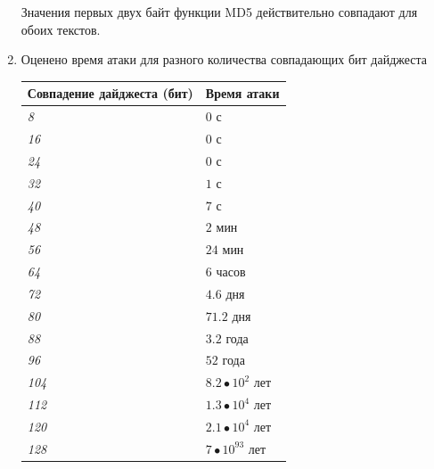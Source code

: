 \documentclass[a4paper, 14pt]{extarticle}
\begin{document}
\begin{enumerate}
        Значения первых двух байт функции MD5 действительно совпадают для обоих текстов.
    \item Оценено время атаки для разного количества совпадающих бит дайджеста

        \begin{table}[h]
            \centering
            \begin{tabular}{@{}ll@{}}
                \toprule
                \textbf{Совпадение дайджеста (бит)} & \textbf{Время атаки}   \\ \midrule
                \textit{8}                          & $0$ с                  \\
                \textit{16}                         & $0$ с                  \\
                \textit{24}                         & $0$ с                  \\
                \textit{32}                         & $1$ с                  \\
                \textit{40}                         & $7$ с                  \\
                \textit{48}                         & $2$ мин                \\
                \textit{56}                         & $24$ мин               \\
                \textit{64}                         & $6$ часов              \\
                \textit{72}                         & $4.6$ дня              \\
                \textit{80}                         & $71.2$ дня             \\
                \textit{88}                         & $3.2$ года             \\
                \textit{96}                         & $52$ года              \\
                \textit{104}                        & $8.2 \bullet 10^2$ лет \\
                \textit{112}                        & $1.3 \bullet 10^4$ лет \\
                \textit{120}                        & $2.1 \bullet 10^4$ лет \\
                \textit{128}                        & $7 \bullet 10^{93}$ лет  \\ \bottomrule
            \end{tabular}
        \end{table}
        \FloatBarrier{}
\end{enumerate}
\end{document}
